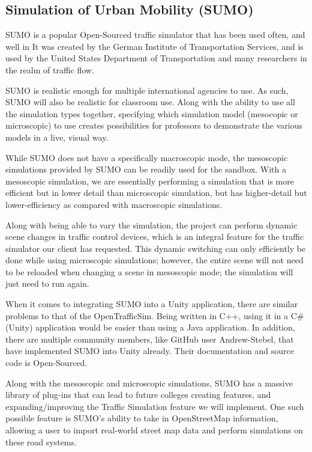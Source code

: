 \documentclass[IEEEtran]{article}
\begin{document}
\subsection{Simulation of Urban Mobility (SUMO)}
\par SUMO is a popular Open-Sourced traffic simulator that has been used often, and well in  It was created by the German Institute of Transportation Services, and is used by the United States Department of Transportation and many researchers in the realm of traffic flow.\cite{2}\cite{6}
\par SUMO is realistic enough for multiple international agencies to use.\cite{6} As such, SUMO will also be realistic for classroom use. Along with the ability to use all the simulation types together, specifying which simulation model (mesocopic or microscopic) to use creates possibilities for professors to demonstrate the various models in a live, visual way.
\par While SUMO does not have a specifically macroscopic mode, the mesoscopic simulations provided by SUMO can be readily used for the sandbox. With a mesoscopic simulation, we are essentially performing a simulation that is more efficient but in lower detail than microscopic simulation, but has higher-detail but lower-efficiency as compared with macroscopic simulations.\cite{7}
\par Along with being able to vary the simulation, the project can perform dynamic scene changes in traffic control devices, which is an integral feature for the traffic simulator our client has requested. This dynamic switching can only efficiently be done while using microscopic simulations; however, the entire scene will not need to be reloaded when changing a scene in mesoscopic mode; the simulation will just need to  run again.   
\par When it comes to integrating SUMO into a Unity application, there are similar problems to that of the OpenTrafficSim. Being written in C++, using it in a C\# (Unity) application would be easier than using a Java application\cite{article}. In addition, there are multiple community members, like GitHub user Andrew-Stebel\cite{8}, that have implemented SUMO into Unity already. Their documentation and source code is Open-Sourced.
\par Along with the mesoscopic and microscopic simulations, SUMO has a massive library of plug-ins that can lead to future colleges creating features, and expanding/improving the Traffic Simulation feature we will implement. One such possible feature is SUMO's ability to take in OpenStreetMap information, allowing a user to import real-world street map data and perform simulations on these road systems. 
\end{document}
